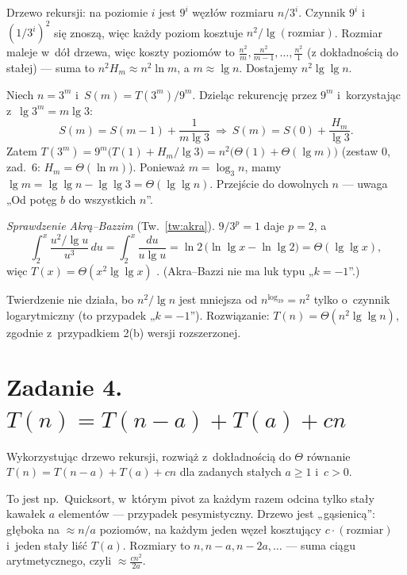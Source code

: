 \documentclass[11pt]{article}
\begin{document}
\begin{intuicja}
Drzewo rekursji: na poziomie $i$ jest $9^i$ węzłów rozmiaru $n/3^i$. Czynnik
$9^i$ i~$(1/3^i)^2$ się znoszą, więc każdy poziom kosztuje $n^2/\lg(\text{rozmiar})$.
Rozmiar maleje w~dół drzewa, więc koszty poziomów to $\frac{n^2}{m},
\frac{n^2}{m-1},\dots,\frac{n^2}{1}$ (z dokładnością do stałej) --- suma to
$n^2H_m\approx n^2\ln m$, a $m\approx\lg n$. Dostajemy $n^2\lg\lg n$.
\end{intuicja}
\formalnie
Niech $n=3^m$ i~$S(m)=T(3^m)/9^m$. Dzieląc rekurencję przez $9^m$
i~korzystając z~$\lg 3^m=m\lg3$:
\[
S(m)=S(m-1)+\frac{1}{m\lg3}\ \Longrightarrow\ S(m)=S(0)+\frac{H_m}{\lg 3}.
\]
Zatem $T(3^m)=9^m\bigl(T(1)+H_m/\lg3\bigr) = n^2\bigl(\Theta(1)+\Theta(\lg m)\bigr)$
(zestaw 0, zad.~6: $H_m=\Theta(\ln m)$). Ponieważ $m=\log_3n$, mamy
$\lg m=\lg\lg n-\lg\lg3=\Theta(\lg\lg n)$. Przejście do dowolnych $n$ ---
uwaga „Od potęg $b$ do wszystkich $n$”.

\emph{Sprawdzenie Akrą--Bazzim} (Tw.~\ref{tw:akra}). $9/3^p=1$ daje $p=2$, a
\[
\int_2^x\frac{u^2/\lg u}{u^3}\,du=\int_2^x\frac{du}{u\lg u}=\ln2\,\bigl(\ln\lg x-\ln\lg 2\bigr)=\Theta(\lg\lg x),
\]
więc $T(x)=\Theta(x^2\lg\lg x)$ \checkmark. (Akra--Bazzi nie ma luk typu „$k=-1$”.)
\begin{odpowiedz}
Twierdzenie nie działa, bo $n^2/\lg n$ jest mniejsza od $n^{\log_39}=n^2$ tylko
o~czynnik logarytmiczny (to przypadek „$k=-1$”). Rozwiązanie:
$T(n)=\Theta(n^2\lg\lg n)$, zgodnie z~przypadkiem 2(b) wersji rozszerzonej.
\end{odpowiedz}

\section{Zadanie 4. \texorpdfstring{$T(n)=T(n-a)+T(a)+cn$}{T(n) = T(n-a) + T(a) + cn}}
\begin{tresc}
Wykorzystując drzewo rekursji, rozwiąż z~dokładnością do $\Theta$ równanie
$T(n)=T(n-a)+T(a)+cn$ dla zadanych stałych $a\ge1$ i~$c>0$.
\end{tresc}

\begin{intuicja}
To jest np.\ Quicksort, w~którym pivot za każdym razem odcina tylko stały
kawałek $a$ elementów --- przypadek pesymistyczny. Drzewo jest „gąsienicą”:
głęboka na $\approx n/a$ poziomów, na każdym jeden węzeł kosztujący
$c\cdot(\text{rozmiar})$ i~jeden stały liść $T(a)$. Rozmiary to
$n,n-a,n-2a,\dots$ --- suma ciągu arytmetycznego, czyli $\approx\frac{cn^2}{2a}$.
\end{intuicja}
\end{document}
